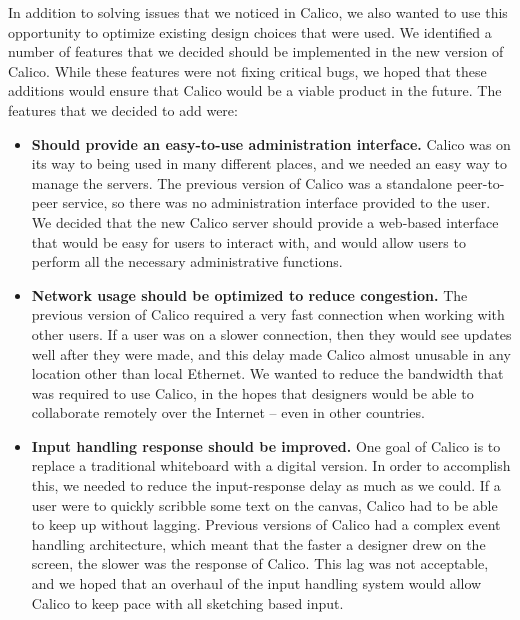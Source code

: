 In addition to solving issues that we noticed in Calico, we also wanted to use this opportunity to optimize existing design choices that were used.
We identified a number of features that we decided should be implemented in the new version of Calico.
While these features were not fixing critical bugs, we hoped that these additions would ensure that Calico would be a viable product in the future. 
The features that we decided to add were:
\begin{itemize}\itemsep1pt
\item 
\textbf{Should provide an easy-to-use administration interface.}
\newline
Calico was on its way to being used in many different places, and we needed an easy way to manage the servers. 
The previous version of Calico was a standalone peer-to-peer service, so there was no administration interface provided to the user.
We decided that the new Calico server should provide a web-based interface that would be easy for users to interact with, and would allow users to perform all the necessary administrative functions.

\item 
\textbf{Network usage should be optimized to reduce congestion.}
\newline
The previous version of Calico required a very fast connection when working with other users. If a user was on a slower connection, then they would see updates well after they were made, and this delay made Calico almost unusable in any location other than local Ethernet.
We wanted to reduce the bandwidth that was required to use Calico, in the hopes that designers would be able to collaborate remotely over the Internet -- even in other countries.

\item 
\textbf{Input handling response should be improved.}
\newline
One goal of Calico is to replace a traditional whiteboard with a digital version. 
In order to accomplish this, we needed to reduce the input-response delay as much as we could. 
If a user were to quickly scribble some text on the canvas, Calico had to be able to keep up without lagging. 
Previous versions of Calico had a complex event handling architecture, which meant that the faster a designer drew on the screen, the slower was the response of Calico. This lag was not acceptable, and we hoped that an overhaul of the input handling system would allow Calico to keep pace with all sketching based input.

\end{itemize}

